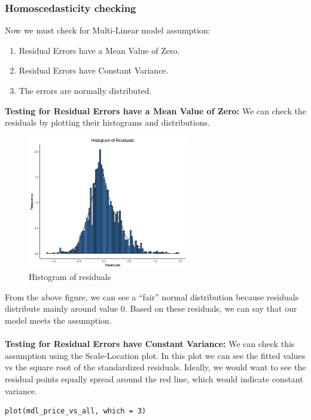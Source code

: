 \documentclass[a4paper]{article}
\theoremstyle{definition}
\begin{document}
\subsubsection{Homoscedasticity checking}
Now we must check for Multi-Linear model assumption: 
\begin{enumerate}
    \item Residual Errors have a Mean Value of Zero.
    \item Residual Errors have Constant Variance.
    \item The errors are normally distributed.
\end{enumerate}
\textbf{Testing for Residual Errors have a Mean Value of Zero:} We can check the residuals by plotting their histograms and distributions.

\begin{figure}[h!]
\begin{center}
\includegraphics[width=7cm,length=8cm]{images/hist.png}
\end{center}
\caption{Histogram of residuals}
\end{figure}
\pagebreak
From the above figure, we can see a “fair” normal distribution because residuals distribute mainly around value 0. Based on these residuals, we can say that our model meets the assumption.\\
\\
\textbf{Testing for Residual Errors have Constant Variance:} We can check this assumption using the Scale-Location plot. In this plot we can see the fitted values vs the square root of the standardized residuals. Ideally, we would want to see the residual points equally spread around the red line, which would indicate constant variance.
\begin{mdframed}[leftline=false,rightline=false,backgroundcolor=lightblue!10,nobreak=false]
    \begin{verbatim}
plot(mdl_price_vs_all, which = 3)
\end{verbatim}
\end{mdframed}
\end{document}
